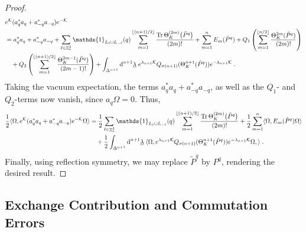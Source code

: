 \documentclass[12pt,a4paper]{article}
\numberwithin{equation}{section}
\newcommand{\cK}{\mathcal{K}}
\newcommand{\1}{\mathbb{I}}
\newcommand{\di}{\textnormal{d}}
\DeclareMathOperator{\Z}{\mathbb{Z}}
\newcommand{\half}{\frac{1}{2}}
\newcommand{\floor}[1]{\left\lfloor #1 \right\rfloor}
\theoremstyle{plain}
\theoremstyle{definition}
\theoremstyle{remark}
\theoremstyle{plain}
\theoremstyle{definition}
\theoremstyle{remark}
\begin{document}
\begin{proof}
\begin{equation}
\begin{aligned}
	&e^{\cK} (a_q^* a_q + a_{-q}^* a_{-q}) e^{-\cK} \\
	&= a_q^* a_q + a_{-q}^* a_{-q}
		+ \sum\limits_{\ell\in \Z^3_*} \mathds{1}_{L_\ell \cup L_{-\ell}}(q) \sum\limits_{m=1}^{\floor{(n+1)/2}} \frac{\mathrm{Tr} \,\Theta^{(2m)}_K \big(\tilde{P}^q\big)}{(2m)!}
		+ \sum\limits_{m=1}^n E_m(\tilde{P}^q)
		+ Q_1\left( \sum\limits_{m=1}^{\floor{n/2}} \frac{\Theta^{2m}_{K}(\tilde{P}^q)}{(2m)!}\right) \\
	&\quad+ Q_2\left(\sum\limits_{m=1}^{\floor{(n+1)/2}} \frac{\Theta^{2m-1}_{K}(\tilde{P}^q)} {(2m-1)!}\right)
		+\int_{\Delta^{n+1}} \di^{n+1}\underline{\lambda} \;
		e^{\lambda_{n+1} \cK}Q_{\sigma(n+1)}(\Theta^{n+1}_{K}(\tilde{P}^q)) e^{-\lambda_{n+1} \cK} \;.
\end{aligned}
\end{equation}
Taking the vacuum expectation, the terms $ a_q^* a_q + a_{-q}^* a_{-q} $, as well as the $ Q_1 $- and $ Q_2 $-terms now vanish, since $ a_q \Omega = 0 $. Thus,
\begin{equation}
\begin{aligned}
	\half \langle \Omega, e^{\cK} (a_q^* a_q + a_{-q}^* a_{-q}) e^{-\cK} \Omega \rangle
	&= \half \sum\limits_{\ell\in \Z^3_*} \mathds{1}_{L_\ell \cup L_{-\ell}}(q) \sum\limits_{m=1}^{\floor{(n+1)/2}} \frac{\mathrm{Tr} \,\Theta^{(2m)}_K \big(\tilde{P}^q\big)}{(2m)!}
		+ \half \sum\limits_{m=1}^n \langle \Omega, E_m(\tilde{P}^q) \Omega \rangle \\
	&\quad +\half \int_{\Delta^{n+1}} \di^{n+1}\underline{\lambda} \;
		\langle \Omega, e^{\lambda_{n+1} \cK}Q_{\sigma(n+1)}(\Theta^{n+1}_{K}(\tilde{P}^q)) e^{-\lambda_{n+1} \cK} \Omega, \rangle \;.
\end{aligned}
\end{equation}
Finally, using reflection symmetry, we may replace $ \tilde{P}^q $ by $ P^q $, rendering the desired result.
\end{proof}



\subsection{Exchange Contribution and Commutation Errors}
\label{sec:extraction_ex}
\end{document}

